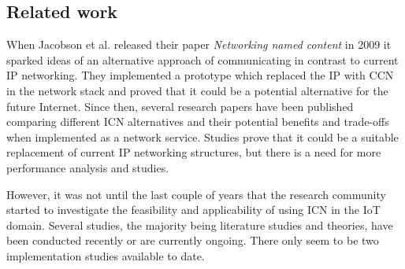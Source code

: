 \subsection{Related work}

When Jacobson et al. released their paper \textit{Networking named content} in 2009 it sparked ideas of an alternative approach of communicating in contrast to current IP networking\cite{Jacobson2009}. They implemented a prototype which replaced the IP with CCN in the network stack and proved that it could be a potential alternative for the future Internet.
Since then, several research papers have been published comparing different ICN alternatives and their potential benefits and trade-offs when implemented as a network service\cite{Ahlgren2012}. Studies prove that it could be a suitable replacement of current IP networking structures, but there is a need for more performance analysis and studies\cite{Ahlgren2012}\cite{Greek-ICN-networking-survey-2014}.

However, it was not until the last couple of years that the research community started to investigate the feasibility and applicability of using ICN in the IoT domain. Several studies, the majority being literature studies and theories, have been conducted recently or are currently ongoing. There only seem to be two implementation studies available to date.

